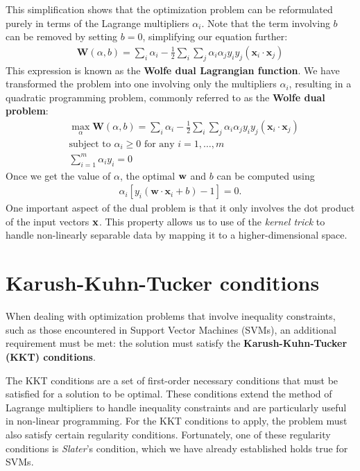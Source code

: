 This simplification shows that the optimization problem can be reformulated purely in terms of the Lagrange multipliers $\alpha_i$. Note that the term involving $b$ can be removed by setting $b=0$, simplifying our equation further:
\begin{align}
	 \mathbf{W}(\alpha, b) = \sum_i \alpha_i -\frac{1}{2}\sum_i\sum_j \alpha_i\alpha_j y_iy_j (\mathbf{x}_i\cdot \mathbf{x}_j)
	 \label{eq:dual_form}
\end{align}
This expression is known as the \textbf{Wolfe dual Lagrangian function}. We have transformed the problem into one involving only the multipliers $\alpha_i$, resulting in a quadratic programming problem, commonly referred to as the \textbf{Wolfe dual problem}:
\begin{align*}
	 &\max_\alpha \mathbf{W}(\alpha, b) = \sum_i \alpha_i -\frac{1}{2}\sum_i\sum_j \alpha_i\alpha_j y_iy_j (\mathbf{x}_i\cdot \mathbf{x}_j)\\
	 &\textrm{subject to } \alpha_i\geq 0 \textrm{ for any } i=1,\dots,m\\
	 & \sum_{i=1}^m \alpha_iy_i=0
\end{align*}
Once we get the value of $\alpha$, the optimal ${\mathbf{w}}$ and $b$ can be computed using 
\begin{align*} 
	\alpha_i \left[ y_i(\mathbf{w} \cdot \mathbf{x}_i + b) - 1 \right] = 0. 
\end{align*}
One important aspect of the dual problem is that it only involves the dot product of the input vectors ${\mathbf{x}}$. This property allows us to use of the \textit{kernel trick} to handle non-linearly separable data by mapping it to a higher-dimensional space. 



\section{Karush-Kuhn-Tucker conditions }

When dealing with optimization problems that involve inequality constraints, such as those encountered in Support Vector Machines (SVMs), an additional requirement must be met: the solution must satisfy the \textbf{Karush-Kuhn-Tucker (KKT) conditions}.

The KKT conditions are a set of first-order necessary conditions that must be satisfied for a solution to be optimal. These conditions extend the method of Lagrange multipliers to handle inequality constraints and are particularly useful in non-linear programming. For the KKT conditions to apply, the problem must also satisfy certain regularity conditions. Fortunately, one of these regularity conditions is \textit{Slater}'s condition, which we have already established holds true for SVMs.

